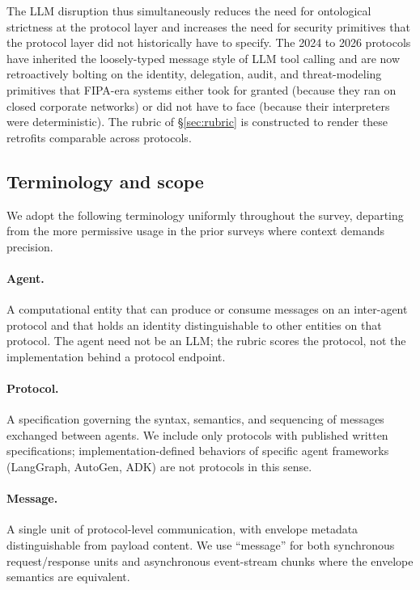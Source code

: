 The LLM disruption thus simultaneously reduces the need for
ontological strictness at the protocol layer and increases the
need for security primitives that the protocol layer did not
historically have to specify. The 2024 to 2026 protocols have
inherited the loosely-typed message style of LLM tool calling
and are now retroactively bolting on the identity, delegation,
audit, and threat-modeling primitives that FIPA-era systems
either took for granted (because they ran on closed corporate
networks) or did not have to face (because their interpreters
were deterministic). The rubric of \S\ref{sec:rubric} is
constructed to render these retrofits comparable across
protocols.

\subsection{Terminology and scope}
\label{sec:background:terms}

We adopt the following terminology uniformly throughout the
survey, departing from the more permissive usage in the prior
surveys where context demands precision.

\paragraph{Agent.} A computational entity that can produce or
consume messages on an inter-agent protocol and that holds an
identity distinguishable to other entities on that protocol.
The agent need not be an LLM; the rubric scores the protocol,
not the implementation behind a protocol endpoint.

\paragraph{Protocol.} A specification governing the syntax,
semantics, and sequencing of messages exchanged between agents.
We include only protocols with published written specifications;
implementation-defined behaviors of specific agent frameworks
(LangGraph, AutoGen, ADK) are not protocols in this sense.

\paragraph{Message.} A single unit of protocol-level
communication, with envelope metadata distinguishable from
payload content. We use ``message'' for both synchronous
request/response units and asynchronous event-stream chunks
where the envelope semantics are equivalent.

